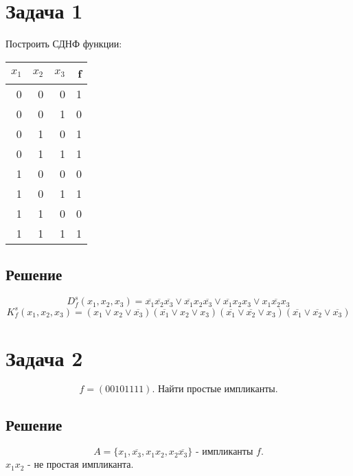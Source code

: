 \documentclass[11pt]{article}
\author{Sergey Makarov}
\date{\today}
\title{}
\begin{document}
\tableofcontents


\section{Задача 1}
\label{sec:org4afbed6}
Построить СДНФ функции:
\begin{center}
\begin{tabular}{rrrr}
\hline
\(x_1\) & \(x_2\) & \(x_3\) & f\\
\hline
0 & 0 & 0 & 1\\
0 & 0 & 1 & 0\\
0 & 1 & 0 & 1\\
0 & 1 & 1 & 1\\
1 & 0 & 0 & 0\\
1 & 0 & 1 & 1\\
1 & 1 & 0 & 0\\
1 & 1 & 1 & 1\\
\hline
\end{tabular}
\end{center}
\subsection{Решение}
\label{sec:orgd04c2a0}
   \begin{equation}
D_f^s(x_1, x_2, x_3) = \overline{x_1}\overline{x_2}\overline{x_3}\vee\overline{x_1}x_2\overline{x_3}
\vee\overline{x_1}x_2x_3\vee x_1\overline{x_2}x_3
   \end{equation}
\begin{equation}
K_f^s(x_1, x_2, x_3) = (x_1\vee x_2\vee\overline{x_3})(\overline{x_1}\vee x_2\vee x_3)
(\overline{x_1}\vee\overline{x_2}\vee x_3)(\overline{x_1}\vee\overline{x_2}\vee\overline{x_3})
\end{equation}
\section{Задача 2}
\label{sec:org0b7fc0d}
  \begin{equation}
f = (00101111). \text{ Найти простые импликанты.}
  \end{equation}
\subsection{Решение}
\label{sec:org1fdb4d2}
   \begin{equation}
A = \{x_1, \overline{x_3}, x_1x_2, x_2\overline{x_3}\}\text{ - импликанты $f$.}
   \end{equation}
$x_1x_2$ - не простая импликанта.
\end{document}
